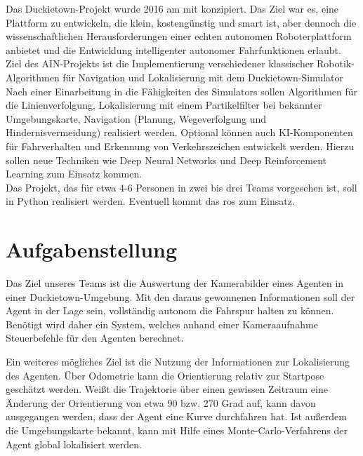 Das Duckietown-Projekt wurde 2016 am \acf{mit} konzipiert. Das Ziel war es, eine Plattform zu
entwickeln, die klein, kostengünstig und \grqq smart\grqq{} ist, aber dennoch die wissenschaftlichen
Herausforderungen einer echten autonomen Roboterplattform anbietet und die Entwicklung
intelligenter autonomer Fahrfunktionen erlaubt. \cite{duckietown}\\

\noindent Ziel des AIN-Projekts ist die Implementierung verschiedener klassischer Robotik-Algorithmen
für Navigation und Lokalisierung mit dem Duckietown-Simulator\\

\noindent Nach einer Einarbeitung in die Fähigkeiten des Simulators sollen Algorithmen für die
Linienverfolgung, Lokalisierung mit einem Partikelfilter bei bekannter Umgebungskarte,
Navigation (Planung, Wegeverfolgung und Hindernisvermeidung) realisiert werden. Optional können auch KI-Komponenten für
Fahrverhalten und Erkennung von Verkehrszeichen entwickelt werden. Hierzu sollen neue
Techniken wie Deep Neural Networks und Deep Reinforcement Learning zum Einsatz
kommen.\\

\noindent Das Projekt, das für etwa 4-6 Personen in zwei bis drei Teams vorgesehen ist, soll in Python realisiert werden.
Eventuell kommt das \acf{ros} zum Einsatz.

\newpage

\section{Aufgabenstellung}

Das Ziel unseres Teams ist die Auswertung der Kamerabilder eines Agenten in einer Duckietown-Umgebung. Mit den daraus gewonnenen Informationen soll der Agent in der Lage sein, vollständig autonom die Fahrspur halten zu können. Benötigt wird daher ein System, welches anhand einer Kameraaufnahme Steuerbefehle für den Agenten berechnet.

Ein weiteres mögliches Ziel ist die Nutzung der Informationen zur Lokalisierung des Agenten. Über Odometrie kann die Orientierung relativ zur Startpose geschätzt werden. Weißt die Trajektorie über einen gewissen Zeitraum eine Änderung der Orientierung von etwa 90 bzw. 270 Grad auf, kann davon ausgegangen werden, dass der Agent eine Kurve durchfahren hat. Ist außerdem die Umgebungskarte bekannt, kann mit Hilfe eines Monte-Carlo-Verfahrens der Agent global lokalisiert werden.\\

